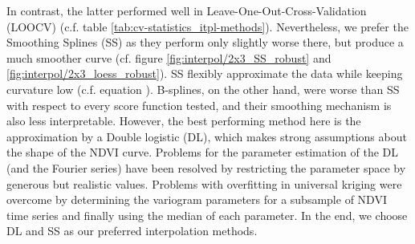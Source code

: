     In contrast, the latter performed well in Leave-One-Out-Cross-Validation (LOOCV) (c.f. table \ref{tab:cv-statistics_itpl-methods}). Nevertheless, we prefer the Smoothing Splines (SS) as they perform only slightly worse there, but produce a much smoother curve (cf. figure \ref{fig:interpol/2x3_SS_robust} and \ref{fig:interpol/2x3_loess_robust}). SS flexibly approximate the data while keeping curvature low (c.f. equation ). B-splines, on the other hand, were worse than SS with respect to every score function tested, and their smoothing mechanism is also less interpretable. However, the best performing method here is the approximation by a Double logistic (DL), which makes strong assumptions about the shape of the NDVI curve. Problems for the parameter estimation of the DL (and the Fourier series) have been resolved by restricting the parameter space by generous but realistic values. Problems with overfitting in universal kriging were overcome by determining the variogram parameters for a subsample of NDVI time series and finally using the median of each parameter. 
    In the end, we choose DL and SS as our preferred interpolation methods.




